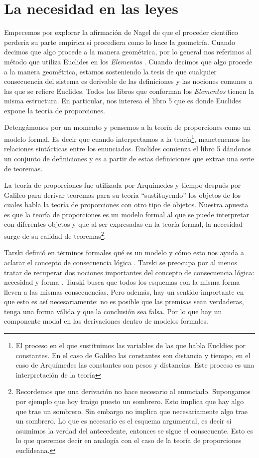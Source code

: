 \section{La necesidad en las leyes}

\noindent Empecemos por explorar la afirmación de Nagel de que el proceder científico perdería su parte empírica si procediera como lo hace la geometría. Cuando decimos que algo procede a la manera geométrica, por lo general nos referimos al método que utiliza Euclides en los \emph{Elementos} \cite{Euclid2008}. Cuando decimos que algo procede a la manera geométrica, estamos sosteniendo la tesis de que cualquier consecuencia del sistema es derivable de las definiciones y las nociones comunes a las que se refiere Euclides. Todos los libros que conforman los \emph{Elementos} tienen la misma estructura. En particular, nos interesa  el libro 5 que es donde Euclides expone la teoría de proporciones.

Detengámonos por un momento y pensemos a la teoría de proporciones como un modelo formal. Es decir que cuando interpretamos a la teoría\footnote{El proceso en el que sustituimos las variables de las que habla Eucldies por constantes. En el caso de Galileo las constantes son distancia y tiempo, en el caso de Arquímedes las constantes son pesos y distancias. Este proceso es una interpretación de la teoría}, manetenemos las relaciones sintácticas entre los enunciados. Euclides comienza el libro 5 dándonos un conjunto de definiciones y es a partir de estas definiciones que extrae una serie de teoremas.

La teoría de proporciones fue utilizada por Arquímedes y tiempo después por Galileo para derivar teoremas para su teoría ``sustituyendo'' los objetos de los cuales habla la teoría de proporciones con otro tipo de objetos. Nuestra apuesta es que la teoría de proporciones es un modelo formal al que se puede interpretar con diferentes objetos y que al ser expresadas en la teoría formal, la necesidad surge de su calidad de teoremas\footnote{Recordemos que una derivación no hace necesario al enunciado. Supongamos por ejemplo que hoy traigo puesto un sombrero. Esto implica que hay algo que trae un sombrero. Sin embargo no implica que necesariamente algo trae un sombrero. Lo que es necesario es el esquema argumental, es decir si asumimos la verdad del antecedente, entonces se sigue el consecuente. Esto es lo que queremos decir en analogía con el caso de la teoría de proporciones euclideana.}.

Tarski definió en términos formales qué es un modelo y cómo esto nos ayuda a aclarar el concepto de consecuencia lógica \cite{Tarski1956}. Tarski se preocupa por al menos tratar de recuperar dos nociones importantes del concepto de consecuencia lógica: necesidad y forma \cite{Torrente2000}. Tarski busca que todos los esquemas con la misma forma lleven a las mismas consecuencias. Pero además, hay un sentido importante en que esto es así necesariamente: no es posible que las premisas sean verdaderas, tenga una forma válida y que la conclusión sea falsa. Por lo que hay un componente modal en las derivaciones dentro de modelos formales.


